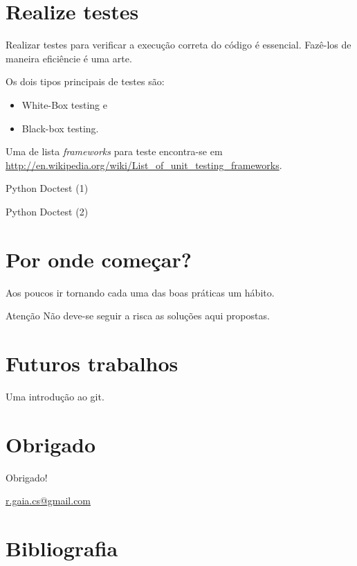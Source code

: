 \documentclass[11pt]{beamer}
\begin{document}
\section{Realize testes}
\begin{frame}
    Realizar testes para verificar a execução correta do código é essencial.
    Fazê-los de maneira eficiêncie é uma arte.

    Os dois tipos principais de testes são:
    \begin{itemize}
        \item White-Box testing e
        \item Black-box testing.
    \end{itemize}

    \pause
    Uma de lista \textit{frameworks} para teste encontra-se em
    \url{http://en.wikipedia.org/wiki/List_of_unit_testing_frameworks}.
\end{frame}

\begin{frame}[fragile]{Python Doctest (1)}
    \begin{example}
        
    \end{example}
\end{frame}

\begin{frame}[fragile]{Python Doctest (2)}
    \begin{example}[Continuação]
        
    \end{example}
\end{frame}

\section{Por onde começar?}
\begin{frame}
    Aos poucos ir tornando cada uma das boas práticas um hábito.
    \pause
    \begin{block}{Atenção}
        Não deve-se seguir a risca as soluções aqui propostas.
    \end{block}
\end{frame}

\section{Futuros trabalhos}
\begin{frame}
    Uma introdução ao git.
\end{frame}

\section*{Obrigado}
\begin{frame}
    \begin{center}
        Obrigado!
    \end{center}
    \begin{center}
        \url{r.gaia.cs@gmail.com}
    \end{center}
\end{frame}

\section*{Bibliografia}
\begin{frame}
    
    
\end{frame}
\end{document}
